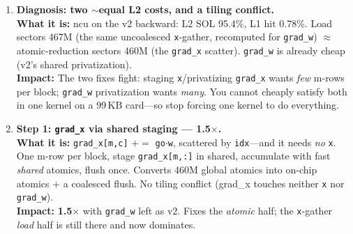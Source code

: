 \documentclass[11pt]{article}
\newcommand{\what}[1]{\textbf{What it is:} #1}
\newcommand{\impact}[1]{\textbf{Impact:} #1}
\begin{document}
\begin{center}
\end{center}

\begin{enumerate}[leftmargin=*, resume]

\item \textbf{Diagnosis: two $\sim$equal L2 costs, and a tiling conflict.}\\
\what{ncu on the v2 backward: L2 SOL 95.4\%, L1 hit 0.78\%. Load sectors 467M (the same
uncoalesced \texttt{x}-gather, recomputed for \texttt{grad\_w}) $\approx$ atomic-reduction sectors
460M (the \texttt{grad\_x} scatter). \texttt{grad\_w} is already cheap (v2's shared privatization).}\\
\impact{The two fixes fight: staging \texttt{x}/privatizing \texttt{grad\_x} wants \emph{few}
m-rows per block; \texttt{grad\_w} privatization wants \emph{many}. You cannot cheaply satisfy both
in one kernel on a 99\,KB card---so stop forcing one kernel to do everything.}

\item \textbf{Step 1: \texttt{grad\_x} via shared staging --- 1.5$\times$.}\\
\what{\texttt{grad\_x[m,c]} $+\!=$ \texttt{go$\cdot$w}, scattered by \texttt{idx}---and it needs
\emph{no} \texttt{x}. One m-row per block, stage \texttt{grad\_x[m,:]} in shared, accumulate with
fast \emph{shared} atomics, flush once. Converts 460M global atomics into on-chip atomics $+$ a
coalesced flush. No tiling conflict (grad\_x touches neither \texttt{x} nor \texttt{grad\_w}).}\\
\impact{\textbf{1.5$\times$} with \texttt{grad\_w} left as v2. Fixes the \emph{atomic} half; the
\texttt{x}-gather \emph{load} half is still there and now dominates.}


\end{enumerate}
\end{document}
